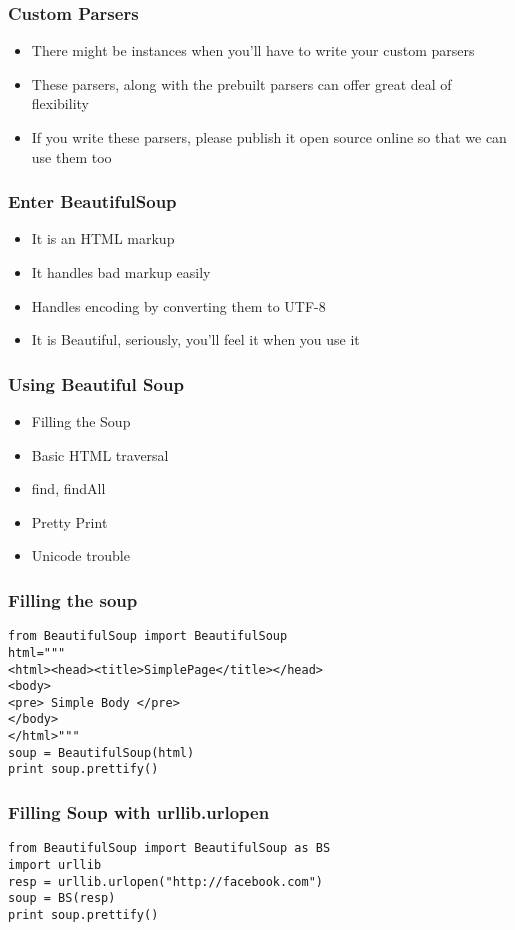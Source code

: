\documentclass{beamer}
\begin{document}
\begin{frame}
\frametitle{Custom Parsers}
\label{sec-4_5}


\begin{itemize}
\item There might be instances when you'll have to write your custom parsers
\item These parsers, along with the prebuilt parsers can offer great deal of flexibility
\item If you write these parsers, please publish it open source online so that we can use them too
\end{itemize}
\end{frame}
\begin{frame}
\frametitle{Enter BeautifulSoup}
\label{sec-4_6}


\begin{itemize}
\item It is an HTML markup
\item It handles bad markup easily
\item Handles encoding by converting them to UTF-8
\item It is Beautiful, seriously, you'll feel it when you use it
\end{itemize}
\end{frame}
\begin{frame}
\frametitle{Using Beautiful Soup}
\label{sec-4_7}


\begin{itemize}
\item Filling the Soup
\item Basic HTML traversal
\item find, findAll
\item Pretty Print
\item Unicode trouble
\end{itemize}
\end{frame}
\begin{frame}[fragile]
\frametitle{Filling the soup}
\label{sec-4_8}

\begin{verbatim}
from BeautifulSoup import BeautifulSoup
html="""
<html><head><title>SimplePage</title></head>
<body>
<pre> Simple Body </pre>
</body>
</html>"""
soup = BeautifulSoup(html)
print soup.prettify()
\end{verbatim}
\end{frame}
\begin{frame}[fragile]
\frametitle{Filling Soup with urllib.urlopen}
\label{sec-4_9}

\begin{verbatim}
from BeautifulSoup import BeautifulSoup as BS
import urllib
resp = urllib.urlopen("http://facebook.com")
soup = BS(resp)
print soup.prettify()
\end{verbatim}
\end{frame}
\end{document}
